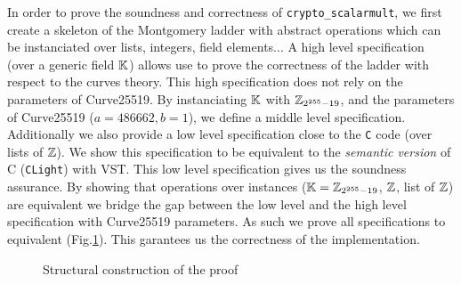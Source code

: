 In order to prove the soundness and correctness of \texttt{crypto\_scalarmult},
we first create a skeleton of the Montgomery ladder with abstract operations which
can be instanciated over lists, integers, field elements...
A high level specification (over a generic field $\mathbb{K}$) allows use to prove the
correctness of the ladder with respect to the curves theory.
This high specification does not rely on the parameters of Curve25519.
By instanciating $\mathbb{K}$ with $\mathbb{Z}_{2^{255}-19}$, and the parameters of Curve25519 ($a = 486662, b = 1$),
we define a middle level specification.
Additionally we also provide a low level specification close to the \texttt{C} code
(over lists of $\mathbb{Z}$). We show this specification to be equivalent to the
\textit{semantic version} of C (\texttt{CLight}) with VST.
This low level specification gives us the soundness assurance.
By showing that operations over instances ($\mathbb{K} = \mathbb{Z}_{2^{255}-19}$, $\mathbb{Z}$, list of $\mathbb{Z}$) are
equivalent we bridge the gap between the low level and the high level specification
with Curve25519 parameters.
As such we prove all specifications to equivalent (Fig.\ref{tk:ProofStructure}).
This garantees us the correctness of the implementation.

\begin{figure}[h]
  
  \caption{Structural construction of the proof}
  \label{tk:ProofStructure}
\end{figure}
